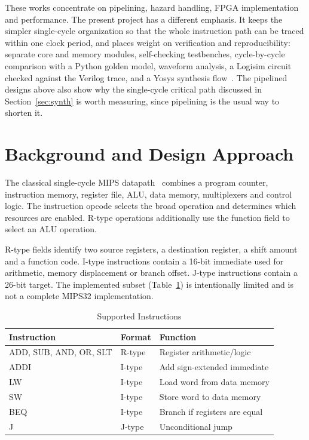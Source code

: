 \documentclass[conference]{IEEEtran}
\begin{document}
These works concentrate on pipelining, hazard handling, FPGA implementation and performance. The present project has a different emphasis. It keeps the simpler single-cycle organization so that the whole instruction path can be traced within one clock period, and places weight on verification and reproducibility: separate core and memory modules, self-checking testbenches, cycle-by-cycle comparison with a Python golden model, waveform analysis, a Logisim circuit checked against the Verilog trace, and a Yosys synthesis flow~\cite{yosys}. The pipelined designs above also show why the single-cycle critical path discussed in Section~\ref{sec:synth} is worth measuring, since pipelining is the usual way to shorten it.

\section{Background and Design Approach}
The classical single-cycle MIPS datapath~\cite{patterson} combines a program counter, instruction memory, register file, ALU, data memory, multiplexers and control logic. The instruction opcode selects the broad operation and determines which resources are enabled. R-type operations additionally use the function field to select an ALU operation.

R-type fields identify two source registers, a destination register, a shift amount and a function code. I-type instructions contain a 16-bit immediate used for arithmetic, memory displacement or branch offset. J-type instructions contain a 26-bit target. The implemented subset (Table~\ref{tab:isa}) is intentionally limited and is not a complete MIPS32 implementation.

\begin{table}[t]
\caption{Supported Instructions}
\label{tab:isa}
\centering\footnotesize\setlength{\tabcolsep}{4pt}
\begin{tabular}{@{}lll@{}}
\toprule
Instruction & Format & Function\\
\midrule
ADD, SUB, AND, OR, SLT & R-type & Register arithmetic/logic\\
ADDI & I-type & Add sign-extended immediate\\
LW & I-type & Load word from data memory\\
SW & I-type & Store word to data memory\\
BEQ & I-type & Branch if registers are equal\\
J & J-type & Unconditional jump\\
\bottomrule
\end{tabular}
\end{table}
\end{document}
